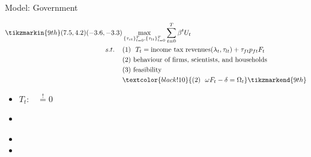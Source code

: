 \documentclass[11pt,aspectratio=169]{beamer}
\begin{document}
\begin{frame}{Model: Government}
	\begin{minipage}[t!]{1\textwidth}
		\begin{align*}
		\tikzmarkin{9th}(7.5,4.2)(-3.6,-3.3)
		&\max_{\{\tau_{ct}\}_{t=0}^{T}, \{\tau_{lt}\}_{t=0}^{T}} \sum_{t=0}^{T}\beta^t U_{t}\\
		s.t. \hspace{4mm}
		&(1)\ \ T_t= \text{income tax revenues}(\lambda_t, \tau_{lt})+\tau_{ft}p_{ft}F_{t}\\
		& (2)\ \text{behaviour of firms, scientists, and households}\\
		& (3)\ \text{feasibility} \\
		&\textcolor{black!10}{
			(2)\ \  \omega F_t-\delta =\Omega_t }
		\tikzmarkend{9th}
		\end{align*}
	\end{minipage}
	
	\small
	\vspace{0mm}
	\begin{minipage}[t!]{0.35\textwidth}
		\vspace{7mm}
		\begin{itemize}
			\item[] $T_t$:\ \ $\overset{!}{=}0$  \vspace{0mm}
			\item[] 
		\end{itemize}
	\end{minipage}
	\begin{minipage}[t!]{0.6\textwidth}
		\vspace{8mm}
		\begin{itemize}
			\item[]%
			\vspace{0mm}	
			\item[] %
		\end{itemize}
	\end{minipage}
	
\end{frame}
\end{document}
